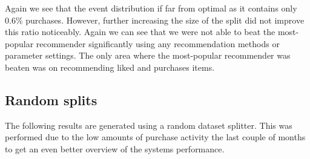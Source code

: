 
Again we see that the event distribution if far from optimal as it contains only 0.6\% purchases. However, further increasing the size of the split did not improve this ratio noticeably.
Again we can see that we were not able to beat the most-popular recommender significantly using any recommendation methods or parameter settings. The only area where the most-popular recommender
was beaten was on recommending liked and purchases items.

\subsection{Random splits}

The following results are generated using a random dataset splitter. This was performed due to the low amounts of purchase activity the last couple of months to get an even better
overview of the systems performance.

